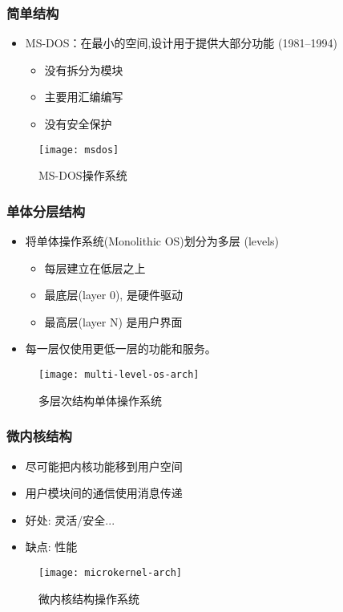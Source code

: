 \begin{frame}

\frametitle{简单结构}

\begin{itemize}
\item MS-DOS：在最小的空间,设计用于提供大部分功能 (1981--1994)
	\begin{itemize}
	\item 没有拆分为模块
	\item 主要用汇编编写
	\item 没有安全保护
	\end{itemize}
\end{itemize}
	\begin{figure}
	\centering
	\texttt{[image: msdos]}
	\caption{MS-DOS操作系统}
\end{figure}

\end{frame}



\begin{frame}
	
	\frametitle{单体分层结构}
	
	\begin{itemize}
		\item 将单体操作系统(Monolithic OS)划分为多层 (levels)
		\begin{itemize}
			\item 每层建立在低层之上
			\item 最底层(layer 0), 是硬件驱动
			\item 最高层(layer N) 是用户界面
		\end{itemize}
	\item 每一层仅使用更低一层的功能和服务。
	\end{itemize}
	\begin{figure}
		\centering
		\texttt{[image: multi-level-os-arch]}
		\caption{多层次结构单体操作系统}
	\end{figure}
	
\end{frame}



\begin{frame}[plain]
	
	\frametitle{微内核结构}
	
	\begin{itemize}
		\item 尽可能把内核功能移到用户空间
		\item 用户模块间的通信使用消息传递
		\item 好处: 灵活/安全...
		\item 缺点: 性能
	\end{itemize}
	\begin{figure}
		\centering
		\texttt{[image: microkernel-arch]}
		\caption{微内核结构操作系统}
	\end{figure}
	
\end{frame}



